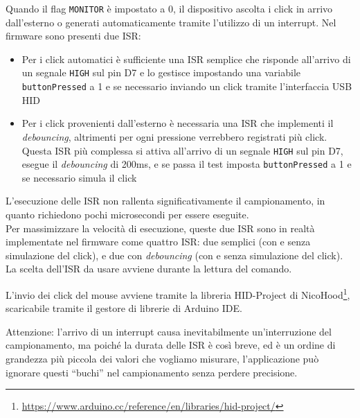 Quando il flag \texttt{MONITOR} è impostato a 0, il dispositivo ascolta i click in arrivo dall'esterno o generati automaticamente tramite l'utilizzo di un interrupt. Nel firmware sono presenti due ISR:\begin{itemize}
	\item Per i click automatici è sufficiente una ISR semplice che risponde all'arrivo di un segnale \texttt{HIGH} sul pin D7 e lo gestisce impostando una variabile \texttt{buttonPressed} a 1 e se necessario inviando un click tramite l'interfaccia USB HID
	\item Per i click provenienti dall'esterno è necessaria una ISR che implementi il \textit{debouncing}, altrimenti per ogni pressione verrebbero registrati più click. Questa ISR più complessa si attiva all'arrivo di un segnale \texttt{HIGH} sul pin D7, esegue il \textit{debouncing} di 200ms, e se passa il test imposta \texttt{buttonPressed} a 1 e se necessario simula il click
\end{itemize}

L'esecuzione delle ISR non rallenta significativamente il campionamento, in quanto richiedono pochi microsecondi per essere eseguite.\\
Per massimizzare la velocità di esecuzione, queste due ISR sono in realtà implementate nel firmware come quattro ISR: due semplici (con e senza simulazione del click), e due con \textit{debouncing} (con e senza simulazione del click). La scelta dell'ISR da usare avviene durante la lettura del comando.

L'invio dei click del mouse avviene tramite la libreria HID-Project di NicoHood\footnote{\url{https://www.arduino.cc/reference/en/libraries/hid-project/}}, scaricabile tramite il gestore di librerie di Arduino IDE.

Attenzione: l'arrivo di un interrupt causa inevitabilmente un'interruzione del campionamento, ma poiché la durata delle ISR è così breve, ed è un ordine di grandezza più piccola dei valori che vogliamo misurare, l'applicazione può ignorare questi ``buchi'' nel campionamento senza perdere precisione.

